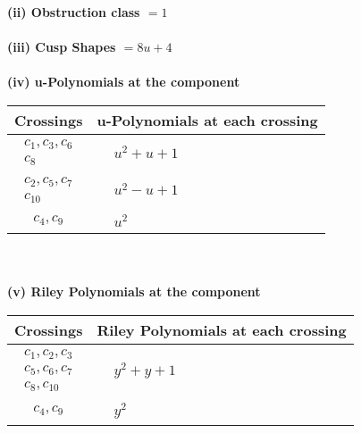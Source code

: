 \documentclass[1p]{elsarticle_modified}
\theoremstyle{definition}
\begin{document}
\flushleft \textbf{(ii) Obstruction class $= 1$}\\~\\
\flushleft \textbf{(iii) Cusp Shapes $= 8 u+4$}\\~\\
\newpage\renewcommand{\arraystretch}{1}
\flushleft \textbf{(iv) u-Polynomials at the component}\newline \\
\begin{tabular}{m{50pt}|m{274pt}}
Crossings & \hspace{64pt}u-Polynomials at each crossing \\
\hline $$\begin{aligned}c_{1},c_{3},c_{6}\\c_{8}\end{aligned}$$&$\begin{aligned}
&u^2+u+1
\end{aligned}$\\
\hline $$\begin{aligned}c_{2},c_{5},c_{7}\\c_{10}\end{aligned}$$&$\begin{aligned}
&u^2- u+1
\end{aligned}$\\
\hline $$\begin{aligned}c_{4},c_{9}\end{aligned}$$&$\begin{aligned}
&u^2
\end{aligned}$\\
\hline
\end{tabular}\\~\\
\newpage\renewcommand{\arraystretch}{1}
\flushleft \textbf{(v) Riley Polynomials at the component}\newline \\
\begin{tabular}{m{50pt}|m{274pt}}
Crossings & \hspace{64pt}Riley Polynomials at each crossing \\
\hline $$\begin{aligned}c_{1},c_{2},c_{3}\\c_{5},c_{6},c_{7}\\c_{8},c_{10}\end{aligned}$$&$\begin{aligned}
&y^2+y+1
\end{aligned}$\\
\hline $$\begin{aligned}c_{4},c_{9}\end{aligned}$$&$\begin{aligned}
&y^2
\end{aligned}$\\
\hline
\end{tabular}\\~\\
\end{document}

